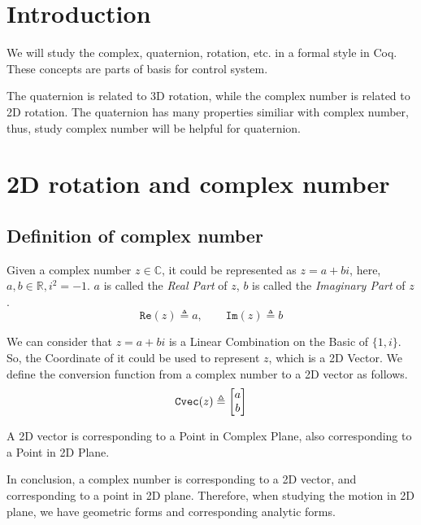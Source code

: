 \documentclass[runningheads]{llncs}
\newcommand{\bR}{\mathbb{R}}
\newcommand{\bC}{\mathbb{C}}
\newcommand{\bmatL}{\begin{bmatrix}}
\newcommand{\bmatR}{\end{bmatrix}}
\begin{document}


\section{Introduction}\label{intro}

We will study the complex, quaternion, rotation, etc. in a formal style in Coq.
These concepts are parts of basis for control system.

The quaternion is related to 3D rotation, while the complex number is related to 2D rotation.
The quaternion has many properties similiar with complex number, thus, study complex number will be helpful for quaternion.

\section{2D rotation and complex number}

\subsection{Definition of complex number}

Given a complex number $z\in\bC$, it could be represented as $z=a+bi$, here, $a,b\in\bR, i^2=-1$.
$a$ is called the \textit{Real Part} of $z$, $b$ is called the \textit{Imaginary Part} of $z$.
\begin{equation}
  \mathtt{Re}(z)\triangleq a,\qquad \mathtt{Im}(z)\triangleq b
\end{equation}

We can consider that $z=a+bi$ is a Linear Combination on the Basic of $\{1,i\}$.
So, the Coordinate of it could be used to represent $z$, which is a 2D Vector.
We define the conversion function from a complex number to a 2D vector as follows.
\begin{equation}
  \Cvec{z}\triangleq\bmatL a\\b\bmatR 
\end{equation}

A 2D vector is corresponding to a Point in Complex Plane, also corresponding to a Point in 2D Plane.

In conclusion, a complex number is corresponding to a 2D vector, and corresponding to a point in 2D plane.
Therefore, when studying the motion in 2D plane, we have geometric forms and corresponding analytic forms.
\end{document}
